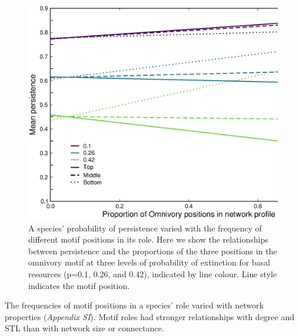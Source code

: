 \documentclass[12pt]{article}
\begin{document}
\begin{spacing}{2.0}
    \begin{figure}[h!]
        \includegraphics[width=.95\textwidth]{figures/persistence_positions_Omnivory.eps}
        \caption{A species' probability of persistence varied with the frequency of different motif positions in its role. Here we show the relationships between persistence and the proportions of the three positions in the omnivory motif at three levels of probability of extinction for basal resources (p=0.1, 0.26, and 0.42), indicated by line colour. Line style indicates the motif  position. }
        \label{figs:persistence_position_motifs}
        \end{figure}


        The frequencies of motif positions in a species' role varied with network properties (\emph{Appendix SI}).
        Motif roles had stronger relationships with degree and STL than with network size or connectance.
        


\clearpage




\end{spacing}
\end{document}
